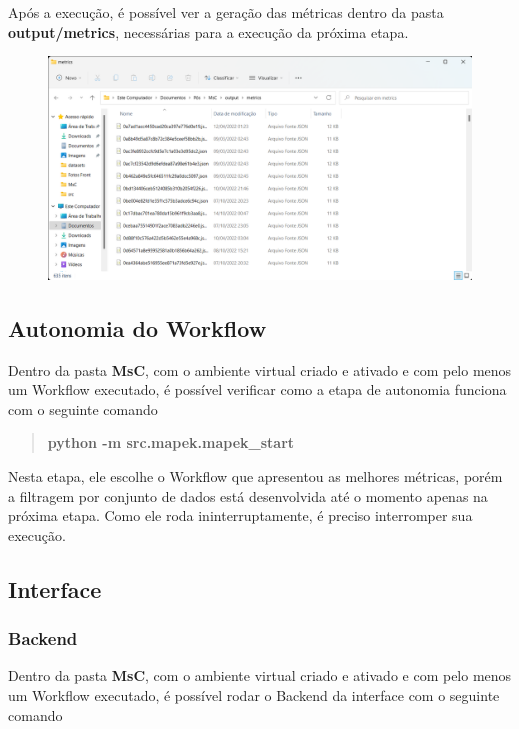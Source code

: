 \documentclass[Portugues,Final]{ic-tese-v3}
\begin{document}
Após a execução, é possível ver a geração das métricas dentro da pasta \textbf{output/metrics}, necessárias para a execução da próxima etapa.

\begin{figure}[H]
\centering
\includegraphics[scale=0.25]{images/doc-install/metrics.png}
\label{fig:DocInstallMetrics}
\end{figure}

\subsection{Autonomia do Workflow}

Dentro da pasta \textbf{MsC}, com o ambiente virtual criado e ativado e com pelo menos um Workflow executado, é possível verificar como a etapa de autonomia funciona com o seguinte comando

\begin{quote}\textbf{python -m src.mapek.mapek\_start}\end{quote}

Nesta etapa, ele escolhe o Workflow que apresentou as melhores métricas, porém a filtragem por conjunto de dados está desenvolvida até o momento apenas na próxima etapa. Como ele roda ininterruptamente, é preciso interromper sua execução.

\subsection{Interface}

\subsubsection{Backend}

Dentro da pasta \textbf{MsC}, com o ambiente virtual criado e ativado e com pelo menos um Workflow executado, é possível rodar o Backend da interface com o seguinte comando
\end{document}
